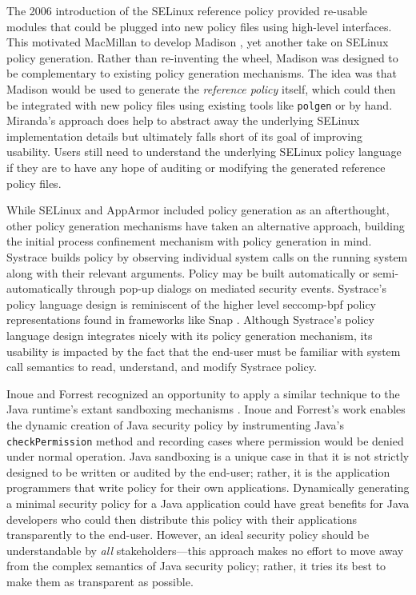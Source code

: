 \documentclass[dvipsnames, 12pt]{article}
\begin{document}
The 2006 introduction of the SELinux reference policy \cite{pebenito2006_refpol}
provided re-usable modules that could be plugged into new policy files using
high-level interfaces. This motivated MacMillan to develop Madison
\cite{macmillan07_madison}, yet another take on SELinux policy generation.
Rather than re-inventing the wheel, Madison was designed to be complementary to
existing policy generation mechanisms. The idea was that Madison would be used
to generate the \textit{reference policy} itself, which could then be integrated
with new policy files using existing tools like \texttt{polgen} or by hand.
Miranda's approach does help to abstract away the underlying SELinux
implementation details but ultimately falls short of its goal of improving
usability. Users still need to understand the underlying SELinux policy language
if they are to have any hope of auditing or modifying the generated reference
policy files.

While SELinux and AppArmor included policy generation as an afterthought, other
policy generation mechanisms have taken an alternative approach, building the
initial process confinement mechanism with policy generation in mind.  Systrace
\cite{provos2003_systrace} builds policy by observing individual system calls on
the running system along with their relevant arguments. Policy may be built
automatically or semi-automatically through pop-up dialogs on mediated security
events. Systrace's policy language design is reminiscent of the higher level
seccomp-bpf policy representations found in frameworks like Snap \cite{snap}.
Although Systrace's policy language design integrates nicely with its policy
generation mechanism, its usability is impacted by the fact that the end-user
must be familiar with system call semantics to read, understand, and modify
Systrace policy.

Inoue and Forrest \cite{inoue05_java, inoue05_thesis} recognized an opportunity
to apply a similar technique to the Java runtime's extant sandboxing mechanisms
\cite{gong1993_java2}. Inoue and Forrest's work enables the dynamic creation of
Java security policy by instrumenting Java's \texttt{checkPermission} method and
recording cases where permission would be denied under normal operation.  Java
sandboxing is a unique case in that it is not strictly designed to be written or
audited by the end-user; rather, it is the application programmers that write
policy for their own applications. Dynamically generating a minimal security
policy for a Java application could have great benefits for Java developers who
could then distribute this policy with their applications transparently to the
end-user.  However, an ideal security policy should be understandable by
\textit{all} stakeholders---this approach makes no effort to move away from the
complex semantics of Java security policy; rather, it tries its best to make
them as transparent as possible.
\end{document}
